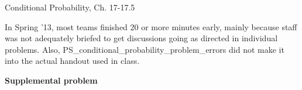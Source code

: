 \documentclass[handout]{mcs}
\begin{document}

\begin{staffnotes}
Conditional Probability, Ch. 17-17.5

In Spring '13, most teams finished 20 or more minutes early, mainly
because staff was not adequately briefed to get discussions going as
directed in individual problems.  Also,
PS\_conditional\_probability\_problem\_errors did not make it into the
actual handout used in class.
\end{staffnotes}







\begin{center}
\textbf{\large Supplemental problem}
\end{center}



\end{document}
